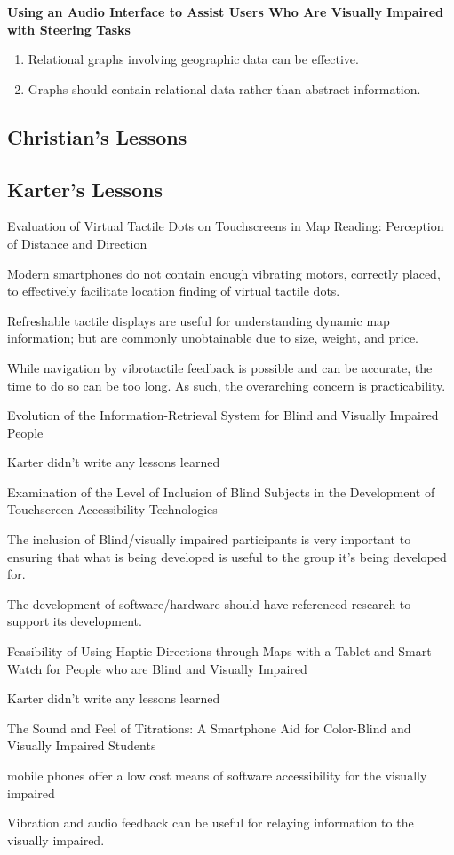 \documentclass{article}
\begin{document}
\cite{} \textbf{Using an Audio Interface to Assist Users Who Are Visually Impaired with Steering Tasks } \cite{}

\begin{enumerate}
    \item Relational graphs involving geographic data can be effective. 
    \item Graphs should contain relational data rather than abstract information. 
\end{enumerate}



\subsection{Christian's Lessons}




\subsection{Karter's Lessons}
Evaluation of Virtual Tactile Dots on Touchscreens in Map Reading: Perception of Distance and Direction 

Modern smartphones do not contain enough vibrating motors, correctly placed, to effectively facilitate location finding of virtual tactile dots. 

Refreshable tactile displays are useful for understanding dynamic map information; but are commonly unobtainable due to size, weight, and price. 

While navigation by vibrotactile feedback is possible and can be accurate, the time to do so can be too long. As such, the overarching concern is practicability. 

Evolution of the Information-Retrieval System for Blind and Visually Impaired People 

Karter didn’t write any lessons learned 

Examination of the Level of Inclusion of Blind Subjects in the Development of Touchscreen Accessibility Technologies 

The inclusion of Blind/visually impaired participants is very important to ensuring that what is being developed is useful to the group it's being developed for. 

The development of software/hardware should have referenced research to support its development. 

Feasibility of Using Haptic Directions through Maps with a Tablet and Smart Watch for People who are Blind and Visually Impaired 

Karter didn’t write any lessons learned 

The Sound and Feel of Titrations: A Smartphone Aid for Color-Blind and Visually Impaired Students 

mobile phones offer a low cost means of software accessibility for the visually impaired  

Vibration and audio feedback can be useful for relaying information to the visually impaired. 




\end{document}

